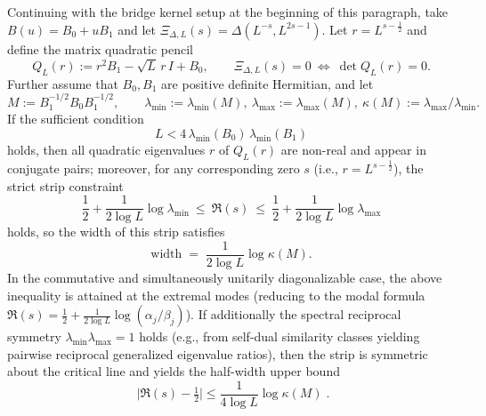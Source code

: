 \begin{theorem}\label{thm:xi-qep-noncommuting-cond-bound}
Continuing with the bridge kernel setup at the beginning of this paragraph, take \(B(u)=B_0+uB_1\) and let \(\Xi_{\Delta,L}(s)=\Delta(L^{-s},L^{2s-1})\).
Let \(r=L^{s-\frac12}\) and define the matrix quadratic pencil
\[
Q_L(r):=r^2B_1-\sqrt L\,r\,I+B_0,
\qquad
\Xi_{\Delta,L}(s)=0\ \Longleftrightarrow\ \det Q_L(r)=0.
\]
Further assume that \(B_0,B_1\) are positive definite Hermitian, and let
\[
M:=B_1^{-1/2}B_0B_1^{-1/2},
\qquad
\lambda_{\min}:=\lambda_{\min}(M),\ \lambda_{\max}:=\lambda_{\max}(M),\
\kappa(M):=\lambda_{\max}/\lambda_{\min}.
\]
If the sufficient condition
\[
L<4\,\lambda_{\min}(B_0)\,\lambda_{\min}(B_1)
\]
holds, then all quadratic eigenvalues \(r\) of \(Q_L(r)\) are non-real and appear in conjugate pairs; moreover, for any corresponding zero \(s\) (i.e., \(r=L^{s-\frac12}\)), the strict strip constraint
\[
\boxed{\;
\frac12+\frac{1}{2\log L}\log\lambda_{\min}
\ \le\
\Re(s)
\ \le\
\frac12+\frac{1}{2\log L}\log\lambda_{\max}\;}
\]
holds, so the width of this strip satisfies
\[
\mathrm{width}
\;=\;
\frac{1}{2\log L}\log\kappa(M).
\]
In the commutative and simultaneously unitarily diagonalizable case, the above inequality is attained at the extremal modes (reducing to the modal formula \(\Re(s)=\frac12+\frac{1}{2\log L}\log(\alpha_j/\beta_j)\)).
If additionally the spectral reciprocal symmetry \(\lambda_{\min}\lambda_{\max}=1\) holds (e.g., from self-dual similarity classes yielding pairwise reciprocal generalized eigenvalue ratios), then the strip is symmetric about the critical line and yields the half-width upper bound
\[
\boxed{\;
\bigl|\Re(s)-\tfrac12\bigr|
\le
\frac{1}{4\log L}\log\kappa(M)\; }.
\]
\end{theorem}

